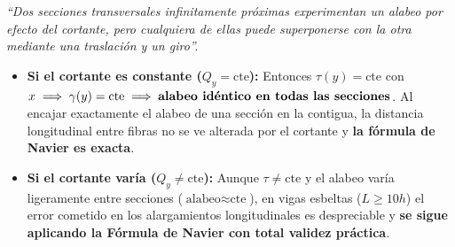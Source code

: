 \begin{tcolorbox}[colback=blue!4!white, colframe=myb!85!black, title=\textbf{Hipótesis Generalizada de Navier-Bernoulli y Validez de Navier}]
    \textit{``Dos secciones transversales infinitamente próximas experimentan un alabeo por efecto del cortante, pero cualquiera de ellas puede superponerse con la otra mediante una traslación y un giro''.}
    \begin{itemize}
        \item \textbf{Si el cortante es constante ($Q_y = \text{cte}$):} Entonces $\tau(y) = \text{cte}$ con $x \implies \gamma(y) = \text{cte} \implies \text{\textbf{alabeo idéntico en todas las secciones}}$. Al encajar exactamente el alabeo de una sección en la contigua, la distancia longitudinal entre fibras no se ve alterada por el cortante y \textbf{la fórmula de Navier es exacta}.
        \item \textbf{Si el cortante varía ($Q_y \neq \text{cte}$):} Aunque $\tau \neq \text{cte}$ y el alabeo varía ligeramente entre secciones ($\text{alabeo} \approx \text{cte}$), en vigas esbeltas ($L \ge 10 h$) el error cometido en los alargamientos longitudinales es despreciable y \textbf{se sigue aplicando la Fórmula de Navier con total validez práctica}.
    \end{itemize}
\end{tcolorbox}
